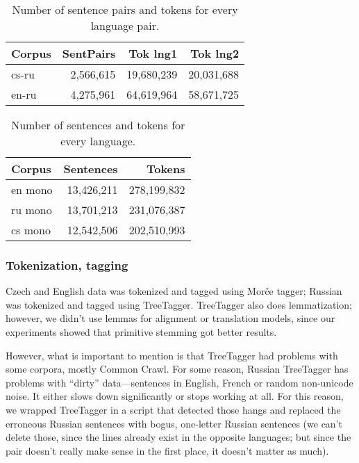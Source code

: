 \documentclass[11pt,letterpaper]{article}
\begin{document}
\begin{table}[htbl]
\begin{center}
\begin{tabular}{l | r r r}
Corpus & SentPairs & Tok lng1 & Tok lng2\\
\hline
cs-ru & 2,566,615 & 19,680,239 & 20,031,688 \\
en-ru & 4,275,961 & 64,619,964 & 58,671,725 \\
\end{tabular}
\end{center}
\caption{Number of sentence pairs and tokens for every language pair.}
\label{tab:russdata}
\end{table}
\begin{table}[htbl]
\begin{center}
\begin{tabular}{l | r r }
Corpus & Sentences & Tokens \\
\hline
en mono& 13,426,211  & 278,199,832   \\
ru mono& 13,701,213 & 231,076,387   \\
cs mono& 12,542,506 & 202,510,993  
\end{tabular}
\end{center}
\caption{Number of sentences and tokens for every language.}
\label{tab:russdatam}
\end{table}

\subsubsection{Tokenization, tagging}

Czech and English data was tokenized and tagged using Morče tagger; Russian was tokenized and tagged using TreeTagger. TreeTagger also does lemmatization; however, we didn't use lemmas for alignment or translation models, since our experiments showed that primitive stemming got better results.

However, what is important to mention is that TreeTagger had problems with some corpora, mostly Common Crawl. For some reason, Russian TreeTagger has problems with ``dirty'' data---sentences in English, French or random non-unicode noise. It either slows down significantly or stops working at all. For this reason, we wrapped TreeTagger in a script that detected those hangs and replaced the erroneous Russian sentences with bogus, one-letter Russian sentences (we can't delete those, since the lines already exist in the opposite languages; but since the pair doesn't really make sense in the first place, it doesn't matter as much).
\end{document}
